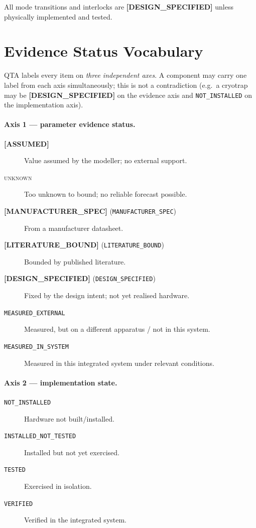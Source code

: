 \documentclass[12pt,a4paper]{article}
\newcommand{\unknown}{\textsc{unknown}}
\newcommand{\assumed}{\textbf{[ASSUMED]}}
\newcommand{\designspec}{\textbf{[DESIGN\_SPECIFIED]}}
\newcommand{\mfrspec}{\textbf{[MANUFACTURER\_SPEC]}}
\newcommand{\litbound}{\textbf{[LITERATURE\_BOUND]}}
\begin{document}
All mode transitions and interlocks are \designspec{} unless physically
implemented and tested.

\section{Evidence Status Vocabulary}
\label{sec:vocab}

QTA labels every item on \emph{three independent axes}. A component may carry one
label from each axis simultaneously; this is not a contradiction (e.g.\ a cryotrap
may be \designspec{} on the evidence axis and \texttt{NOT\_INSTALLED} on the
implementation axis).

\paragraph{Axis 1 --- parameter evidence status.}
\begin{description}
  \item[\assumed{}] Value assumed by the modeller; no external support.
  \item[\unknown{}] Too unknown to bound; no reliable forecast possible.
  \item[\mfrspec{} (\texttt{MANUFACTURER\_SPEC})] From a manufacturer datasheet.
  \item[\litbound{} (\texttt{LITERATURE\_BOUND})] Bounded by published literature.
  \item[\designspec{} (\texttt{DESIGN\_SPECIFIED})] Fixed by the design intent; not yet realised hardware.
  \item[\texttt{MEASURED\_EXTERNAL}] Measured, but on a different apparatus / not in this system.
  \item[\texttt{MEASURED\_IN\_SYSTEM}] Measured in this integrated system under relevant conditions.
\end{description}

\paragraph{Axis 2 --- implementation state.}
\begin{description}
  \item[\texttt{NOT\_INSTALLED}] Hardware not built/installed.
  \item[\texttt{INSTALLED\_NOT\_TESTED}] Installed but not yet exercised.
  \item[\texttt{TESTED}] Exercised in isolation.
  \item[\texttt{VERIFIED}] Verified in the integrated system.
\end{description}
\end{document}
